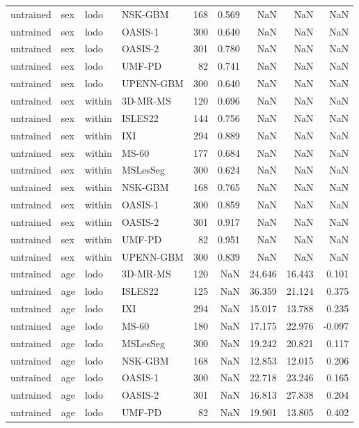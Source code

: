 \begin{tabular}{llllrrrrr}
untrained & sex & lodo & NSK-GBM & 168 & 0.569 & NaN & NaN & NaN \\
untrained & sex & lodo & OASIS-1 & 300 & 0.640 & NaN & NaN & NaN \\
untrained & sex & lodo & OASIS-2 & 301 & 0.780 & NaN & NaN & NaN \\
untrained & sex & lodo & UMF-PD & 82 & 0.741 & NaN & NaN & NaN \\
untrained & sex & lodo & UPENN-GBM & 300 & 0.640 & NaN & NaN & NaN \\
untrained & sex & within & 3D-MR-MS & 120 & 0.696 & NaN & NaN & NaN \\
untrained & sex & within & ISLES22 & 144 & 0.756 & NaN & NaN & NaN \\
untrained & sex & within & IXI & 294 & 0.889 & NaN & NaN & NaN \\
untrained & sex & within & MS-60 & 177 & 0.684 & NaN & NaN & NaN \\
untrained & sex & within & MSLesSeg & 300 & 0.624 & NaN & NaN & NaN \\
untrained & sex & within & NSK-GBM & 168 & 0.765 & NaN & NaN & NaN \\
untrained & sex & within & OASIS-1 & 300 & 0.859 & NaN & NaN & NaN \\
untrained & sex & within & OASIS-2 & 301 & 0.917 & NaN & NaN & NaN \\
untrained & sex & within & UMF-PD & 82 & 0.951 & NaN & NaN & NaN \\
untrained & sex & within & UPENN-GBM & 300 & 0.839 & NaN & NaN & NaN \\
untrained & age & lodo & 3D-MR-MS & 120 & NaN & 24.646 & 16.443 & 0.101 \\
untrained & age & lodo & ISLES22 & 125 & NaN & 36.359 & 21.124 & 0.375 \\
untrained & age & lodo & IXI & 294 & NaN & 15.017 & 13.788 & 0.235 \\
untrained & age & lodo & MS-60 & 180 & NaN & 17.175 & 22.976 & -0.097 \\
untrained & age & lodo & MSLesSeg & 300 & NaN & 19.242 & 20.821 & 0.117 \\
untrained & age & lodo & NSK-GBM & 168 & NaN & 12.853 & 12.015 & 0.206 \\
untrained & age & lodo & OASIS-1 & 300 & NaN & 22.718 & 23.246 & 0.165 \\
untrained & age & lodo & OASIS-2 & 301 & NaN & 16.813 & 27.838 & 0.204 \\
untrained & age & lodo & UMF-PD & 82 & NaN & 19.901 & 13.805 & 0.402 \\

\end{tabular}
